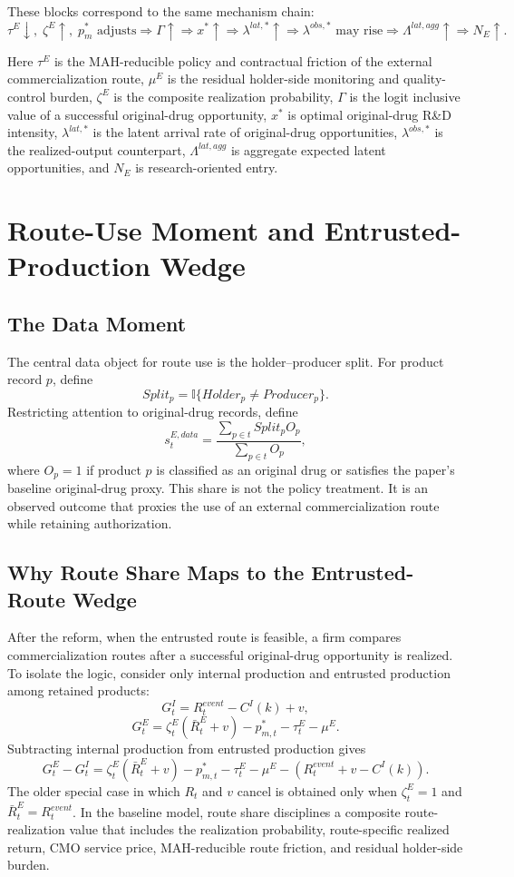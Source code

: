 \documentclass[12pt]{article}
\newcommand{\1}{\mathbf{1}}
\newcommand{\ind}{\mathbb{I}}
\begin{document}
These blocks correspond to the same mechanism chain:
\[
\tau^E \downarrow,\;\zeta^E\uparrow,\;p_m^*\text{ adjusts}
\Rightarrow
\Gamma \uparrow
\Rightarrow
x^* \uparrow
\Rightarrow
\lambda^{lat,*} \uparrow
\Rightarrow
\lambda^{obs,*}\text{ may rise}
\Rightarrow
\Lambda^{lat,agg} \uparrow
\Rightarrow
N_E \uparrow.
\]

Here $\tau^E$ is the MAH-reducible policy and contractual friction of the external commercialization route, $\mu^E$ is the residual holder-side monitoring and quality-control burden, $\zeta^E$ is the composite realization probability, $\Gamma$ is the logit inclusive value of a successful original-drug opportunity, $x^*$ is optimal original-drug R\&D intensity, $\lambda^{lat,*}$ is the latent arrival rate of original-drug opportunities, $\lambda^{obs,*}$ is the realized-output counterpart, $\Lambda^{lat,agg}$ is aggregate expected latent opportunities, and $N_E$ is research-oriented entry.

\section{Route-Use Moment and Entrusted-Production Wedge}

\subsection{The Data Moment}

The central data object for route use is the holder--producer split. For product record $p$, define
\[
    Split_p = \ind\{Holder_p \neq Producer_p\}.
\]
Restricting attention to original-drug records, define
\[
    s_t^{E,data}
    =
    \frac{\sum_{p\in t} Split_p O_p}
    {\sum_{p\in t} O_p},
\]
where $O_p=1$ if product $p$ is classified as an original drug or satisfies the paper's baseline original-drug proxy. This share is not the policy treatment. It is an observed outcome that proxies the use of an external commercialization route while retaining authorization.

\subsection{Why Route Share Maps to the Entrusted-Route Wedge}

After the reform, when the entrusted route is feasible, a firm compares commercialization routes after a successful original-drug opportunity is realized. To isolate the logic, consider only internal production and entrusted production among retained products:
\[
    G_t^I = R_t^{event} - C^I(k) + v,
\]
\[
    G_t^E =
    \zeta_t^E(\bar R_t^E+v)-p_{m,t}^*-\tau_t^E-\mu^E.
\]
Subtracting internal production from entrusted production gives
\[
    G_t^E-G_t^I
    =
    \zeta_t^E(\bar R_t^E+v)-p_{m,t}^*-\tau_t^E-\mu^E
    -(R_t^{event}+v-C^I(k)).
\]
The older special case in which $R_t$ and $v$ cancel is obtained only when $\zeta_t^E=1$ and $\bar R_t^E=R_t^{event}$. In the baseline model, route share disciplines a composite route-realization value that includes the realization probability, route-specific realized return, CMO service price, MAH-reducible route friction, and residual holder-side burden.
\end{document}
